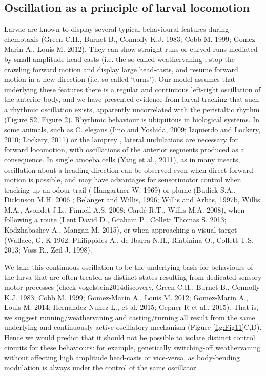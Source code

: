 \documentclass[10pt,a4paper]{article}
\begin{document}
\subsection{Oscillation as a principle of larval locomotion}
Larvae are known to display several typical behavioural features during chemotaxis (Green C.H., Burnet B., Connolly K.J. 1983; Cobb M. 1999; Gomez-Marin A., Louis M. 2012). They can show straight runs or curved runs mediated by small amplitude head-casts (i.e. the so-called weathervaning \cite{iino2009parallel,ohashi2014novel,gomez2014multilevel}, stop the crawling forward motion and display large head-casts, and resume forward motion in a new direction (i.e. so-called ‘turns’). Our model assumes that underlying these features there is a regular and continuous left-right oscillation of the anterior body, and we have presented evidence from larval tracking that such a rhythmic oscillation exists, apparently uncorrelated with the peristaltic rhythm (Figure S2, Figure 2). Rhythmic behaviour is ubiquitous in biological systems. In some animals, such as C. elegans (Iino and Yoshida, 2009; Izquierdo and Lockery, 2010; Lockery, 2011) or the lamprey \citep{lansner1997realistic,wilson1999spikes}, lateral undulations are necessary for forward locomotion, with oscillations of the anterior segments produced as a consequence. In single amoeba cells (Yang et al., 2011), as in many insects, oscillation about a heading direction can be observed even when direct forward motion is possible, and may have advantages for sensorimotor control when tracking up an odour trail ( Hangartner W. 1969) or plume (Budick S.A., Dickinson M.H. 2006 ; Belanger and Willis, 1996; Willis and Arbas, 1997b, Willis M.A., Avondet J.L., Finnell A.S. 2008; Cardé R.T., Willis M.A. 2008), when following a route (Lent David D., Graham P., Collett Thomas S. 2013; Kodzhabashev A., Mangan M. 2015), or when approaching a visual target (Wallace, G. K 1962; Philippides A., de Ibarra N.H., Riabinina O., Collett T.S. 2013; Voss R., Zeil J. 1998).

We take this continuous oscillation to be the underlying basis for behaviours of the larva that are often treated as distinct states resulting from dedicated sensory motor processes (check vogelstein2014discovery, Green C.H., Burnet B., Connolly K.J. 1983; Cobb M. 1999; Gomez-Marin A., Louis M. 2012; Gomez-Marin A., Louis M. 2014; Hernandez-Nunez L., et al. 2015; Gepner R et al., 2015). That is, we suggest running/weathervaning and casting/turning all result from the same underlying and continuously active oscillatory mechanism (Figure \ref{fig:Fig11}C,D). Hence we would predict that it should not be possible to isolate distinct control circuits for these behaviours: for example, genetically switching-off weathervaning without affecting high amplitude head-casts or vice-versa, as body-bending modulation is always under the control of the same oscillator. 
\end{document}
